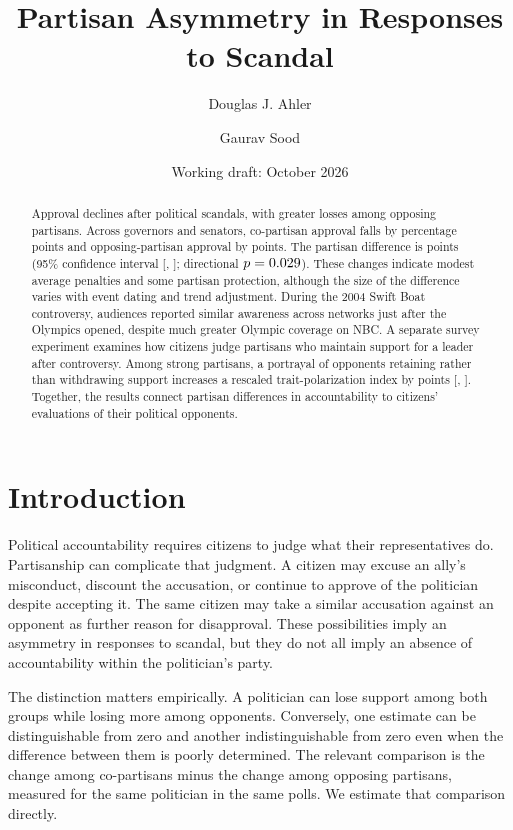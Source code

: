 \documentclass[11pt]{article}
\title{Partisan Asymmetry in Responses to Scandal}
\author{Douglas J. Ahler \and Gaurav Sood}
\date{Working draft: October 2026}
\begin{document}
\maketitle
\begin{abstract}
\noindent Approval declines after political scandals, with greater losses among opposing partisans. Across \CountMainPoliticians{} governors and senators, co-partisan approval falls by \InPenalty{} percentage points and opposing-partisan approval by \OutPenalty{} points. The partisan difference is \GapEstimate{} points (95\% confidence interval [\GapLower, \GapUpper]; directional $p=0.029$). These changes indicate modest average penalties and some partisan protection, although the size of the difference varies with event dating and trend adjustment. During the 2004 Swift Boat controversy, audiences reported similar awareness across networks just after the Olympics opened, despite much greater Olympic coverage on NBC. A separate survey experiment examines how citizens judge partisans who maintain support for a leader after controversy. Among strong partisans, a portrayal of opponents retaining rather than withdrawing support increases a rescaled trait-polarization index by \ExpStrongResponseEstimate{} points [\ExpStrongResponseLower, \ExpStrongResponseUpper]. Together, the results connect partisan differences in accountability to citizens' evaluations of their political opponents.
\end{abstract}

\section{Introduction}

Political accountability requires citizens to judge what their representatives do. Partisanship can complicate that judgment. A citizen may excuse an ally's misconduct, discount the accusation, or continue to approve of the politician despite accepting it. The same citizen may take a similar accusation against an opponent as further reason for disapproval. These possibilities imply an asymmetry in responses to scandal, but they do not all imply an absence of accountability within the politician's party.

The distinction matters empirically. A politician can lose support among both groups while losing more among opponents. Conversely, one estimate can be distinguishable from zero and another indistinguishable from zero even when the difference between them is poorly determined. The relevant comparison is the change among co-partisans minus the change among opposing partisans, measured for the same politician in the same polls. We estimate that comparison directly.
\end{document}
